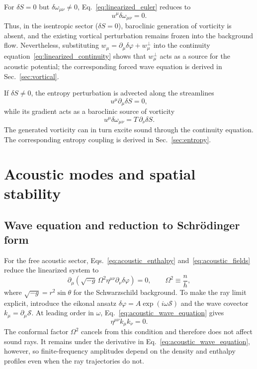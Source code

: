 \documentclass[12pt,a4paper,preprint,nopreprintline]{elsarticle}
\begin{document}
For $\delta S=0$ but $\delta\omega_{\mu\nu}\neq0$, Eq.~\eqref{eq:linearized_euler} reduces to
\begin{equation}
    u^{\mu}\delta\omega_{\mu\nu}=0.
    \label{eq:vortex_frozen}
\end{equation}
Thus, in the isentropic sector ($\delta S=0$), baroclinic generation of vorticity is absent, and the existing vortical perturbation remains frozen into the background flow. Nevertheless, substituting $w_{\mu}=\partial_{\mu}\delta\varphi+w_{\mu}^{\perp}$ into the continuity equation~\eqref{eq:linearized_continuity} shows that $w_{\mu}^{\perp}$ acts as a source for the acoustic potential; the corresponding forced wave equation is derived in Sec.~\ref{sec:vortical}.

If $\delta S\neq0$, the entropy perturbation is advected along the streamlines
\begin{equation}
    u^{\mu}\partial_{\mu}\delta S=0,
    \label{eq:entropy_mode_advection}
\end{equation}
while its gradient acts as a baroclinic source of vorticity
\begin{equation}
    u^{\mu}\delta\omega_{\mu\nu}
    =
    T\,\partial_{\nu}\delta S.
    \label{eq:entropy_vorticity_source}
\end{equation}
The generated vorticity can in turn excite sound through the continuity equation. The corresponding entropy coupling is derived in Sec.~\ref{sec:entropy}.

\section{Acoustic modes and spatial stability}
\label{sec:acoustic}

\subsection{Wave equation and reduction to Schr\"odinger form}
\label{sec:acoustic_wave_equation}

For the free acoustic sector, Eqs.~\eqref{eq:acoustic_enthalpy} and~\eqref{eq:acoustic_fields} reduce the linearized system to
\begin{equation}
    \partial_{\mu}
    \left(
        \sqrt{-g}\,\Omega^{2}\eta^{\mu\nu}
        \partial_{\nu}\delta\varphi
    \right)=0,
    \qquad
    \Omega^{2}\equiv\frac{n}{h},
    \label{eq:acoustic_wave_equation}
\end{equation}
where $\sqrt{-g}=r^{2}\sin\theta$ for the Schwarzschild background. To make the ray limit explicit, introduce the eikonal ansatz $\delta\varphi=A\exp(i\omega\mathcal{S})$ and the wave covector $k_{\mu}=\partial_{\mu}\mathcal{S}$. At leading order in $\omega$, Eq.~\eqref{eq:acoustic_wave_equation} gives
\begin{equation}
    \eta^{\mu\nu}k_{\mu}k_{\nu}=0.
    \label{eq:acoustic_eikonal_relation}
\end{equation}
The conformal factor $\Omega^{2}$ cancels from this condition and therefore does not affect sound rays. It remains under the derivative in Eq.~\eqref{eq:acoustic_wave_equation}, however, so finite-frequency amplitudes depend on the density and enthalpy profiles even when the ray trajectories do not.
\end{document}
